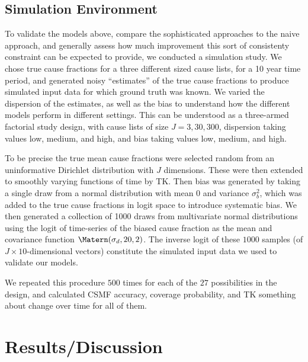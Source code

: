   \subsection*{Simulation Environment}
  To validate the models above, compare the sophisticated approaches
  to the naive approach, and generally assess how much improvement
  this sort of consistenty constraint can be expected to provide, we
  conducted a simulation study.  We chose true cause fractions for a
  three different sized cause lists, for a 10 year
  time period, and generated noisy ``estimates'' of the true cause
  fractions to produce simulated input data for which ground truth was
  known.  We varied the dispersion of the estimates, as well as the
  bias to understand how the different models perform in different
  settings.  This can be understood as a three-armed factorial study
  design, with cause lists of size $J=3, 30, 300$, dispersion taking
  values low, medium, and high, and bias taking values low, medium,
  and high.

  To be precise the true mean cause fractions were selected random from an
  uninformative Dirichlet distribution with $J$ dimensions. These were
  then extended to smoothly varying functions of time by TK. Then bias
  was generated by taking a single draw from a normal distribution
  with mean 0 and variance $\sigma_b^2$, which was added to the true
  cause fractions in logit space to introduce systematic bias. We then
  generated a collection of 1000
  draws from multivariate normal distributions using the logit of time-series
  of the biased cause fraction
  as the mean and covariance function $\Matern(\sigma_d, 20,
  2)$. The inverse logit of these $1000$ samples (of $J\times 10$-dimensional vectors)
  constitute the simulated input data we used to validate our models.

  We repeated this procedure $500$ times for each of the $27$
  possibilities in the design, and calculated CSMF accuracy, coverage
  probability, and TK something about change over time for all of
  them.


\section*{Results/Discussion}
